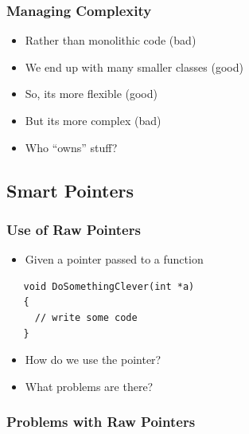 \subsubsection{Managing Complexity}\label{managing-complexity}

\begin{itemize}
\itemsep1pt\parskip0pt
\item
  Rather than monolithic code (bad)
\item
  We end up with many smaller classes (good)
\item
  So, its more flexible (good)
\item
  But its more complex (bad)
\item
  Who ``owns'' stuff?
\end{itemize}

\subsection{Smart Pointers}\label{smart-pointers}

\subsubsection{Use of Raw Pointers}\label{use-of-raw-pointers}

\begin{itemize}
\itemsep1pt\parskip0pt
\item
  Given a pointer passed to a function
\end{itemize}

\begin{verbatim}
   void DoSomethingClever(int *a) 
   {
     // write some code
   }
\end{verbatim}

\begin{itemize}
\itemsep1pt\parskip0pt
\item
  How do we use the pointer?
\item
  What problems are there?
\end{itemize}

\subsubsection{Problems with Raw
Pointers}\label{problems-with-raw-pointers}

